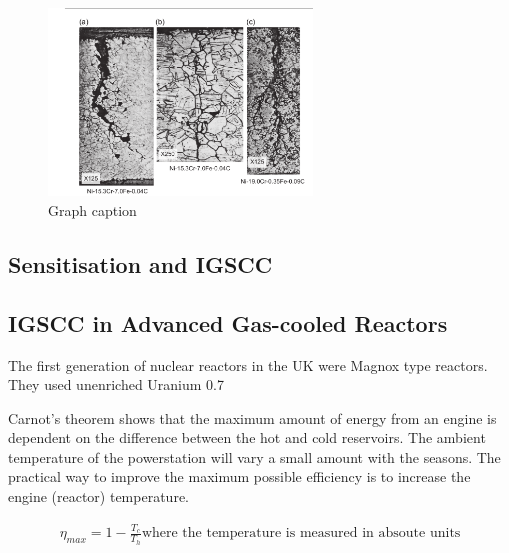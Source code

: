 \begin{figure}[tbp]
  \begin{center}
    \includegraphics[width=7.0cm]{chapters/background_austenitic_steels_in_nuclear/images/igscc_nickel_alloy600.png}
    \caption{Graph caption}
    \label{image:flux1}
  \end{center}
\end{figure}








\subsection{Sensitisation and IGSCC}









\subsection{IGSCC in Advanced Gas-cooled Reactors}

The first generation of nuclear reactors in the UK were Magnox type reactors.  They used unenriched Uranium 0.7%

Carnot's theorem shows that the maximum amount of energy from an engine is dependent on the difference between the hot and cold reservoirs.  The ambient temperature of the powerstation will vary a small amount with the seasons.  The practical way to improve the maximum possible efficiency is to increase the engine (reactor) temperature.

\begin{equation}
\begin{split}
\eta_{max} = 1 - \frac{T_c}{T_h}
\text{where the temperature is measured in absoute units}
\end{split}
\end{equation}

